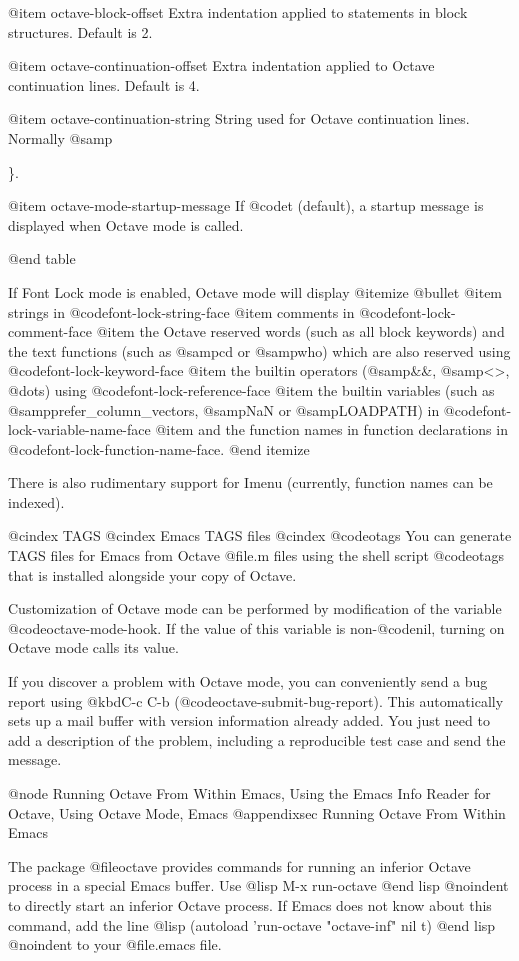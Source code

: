 {{@item octave-block-offset
Extra indentation applied to statements in block structures.
Default is 2.

@item octave-continuation-offset
Extra indentation applied to Octave continuation lines.
Default is 4. 

@item octave-continuation-string
String used for Octave continuation lines.
Normally @samp{\}.

@item octave-mode-startup-message
If @code{t} (default), a startup message is displayed when Octave mode
is called.

@end table

If Font Lock mode is enabled, Octave mode will display
@itemize @bullet
@item
strings in @code{font-lock-string-face}
@item
comments in @code{font-lock-comment-face}
@item
the Octave reserved words (such as all block keywords) and the text
functions (such as @samp{cd} or @samp{who}) which are also reserved
using @code{font-lock-keyword-face}
@item
the builtin operators (@samp{&&}, @samp{<>}, @dots{}) using
@code{font-lock-reference-face}
@item
the builtin variables (such as @samp{prefer_column_vectors}, @samp{NaN}
or @samp{LOADPATH}) in @code{font-lock-variable-name-face}
@item
and the function names in function declarations in
@code{font-lock-function-name-face}.
@end itemize

There is also rudimentary support for Imenu (currently, function names
can be indexed).

@cindex TAGS
@cindex Emacs TAGS files
@cindex @code{otags}
You can generate TAGS files for Emacs from Octave @file{.m} files using
the shell script @code{otags} that is installed alongside your copy of
Octave.

Customization of Octave mode can be performed by modification of the
variable @code{octave-mode-hook}.  If the value of this variable is
non-@code{nil}, turning on Octave mode calls its value.

If you discover a problem with Octave mode, you can conveniently send a
bug report using @kbd{C-c C-b} (@code{octave-submit-bug-report}).  This
automatically sets up a mail buffer with version information already
added.  You just need to add a description of the problem, including a
reproducible test case and send the message.

@node Running Octave From Within Emacs, Using the Emacs Info Reader for Octave, Using Octave Mode, Emacs
@appendixsec Running Octave From Within Emacs

The package @file{octave} provides commands for running an inferior
Octave process in a special Emacs buffer.  Use 
@lisp
M-x run-octave
@end lisp
@noindent
to directly start an inferior Octave process.  If Emacs does not know
about this command, add the line
@lisp
(autoload 'run-octave "octave-inf" nil t)
@end lisp
@noindent
to your @file{.emacs} file.

}}}
